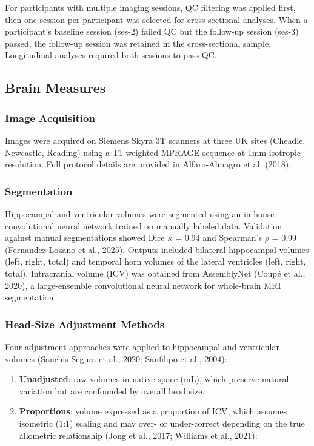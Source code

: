 \documentclass[
]{article}
\begin{document}
For participants with multiple imaging sessions, QC filtering was
applied first, then one session per participant was selected for
cross-sectional analyses. When a participant's baseline session (ses-2)
failed QC but the follow-up session (ses-3) passed, the follow-up
session was retained in the cross-sectional sample. Longitudinal
analyses required both sessions to pass QC.

\subsection{Brain Measures}\label{brain-measures}

\subsubsection{Image Acquisition}\label{image-acquisition}

Images were acquired on Siemens Skyra 3T scanners at three UK sites
(Cheadle, Newcastle, Reading) using a T1-weighted MPRAGE sequence at 1mm
isotropic resolution. Full protocol details are provided in
Alfaro-Almagro et al. (2018).

\subsubsection{Segmentation}\label{segmentation}

Hippocampal and ventricular volumes were segmented using an in-house
convolutional neural network trained on manually labeled data.
Validation against manual segmentations showed Dice \(\kappa\) = 0.94
and Spearman's \(\rho\) = 0.99 (Fernandez-Lozano et al., 2025). Outputs
included bilateral hippocampal volumes (left, right, total) and temporal
horn volumes of the lateral ventricles (left, right, total).
Intracranial volume (ICV) was obtained from AssemblyNet (Coupé et al.,
2020), a large-ensemble convolutional neural network for whole-brain MRI
segmentation.

\subsubsection{Head-Size Adjustment
Methods}\label{head-size-adjustment-methods}

Four adjustment approaches were applied to hippocampal and ventricular
volumes (Sanchis-Segura et al., 2020; Sanfilipo et al., 2004):

\begin{enumerate}
\def\labelenumi{\arabic{enumi}.}
\item
  \textbf{Unadjusted}: raw volumes in native space (mL), which preserve
  natural variation but are confounded by overall head size.
\item
  \textbf{Proportions}: volume expressed as a proportion of ICV, which
  assumes isometric (1:1) scaling and may over- or under-correct
  depending on the true allometric relationship (Jong et al., 2017;
  Williams et al., 2021):
\end{enumerate}
\end{document}
